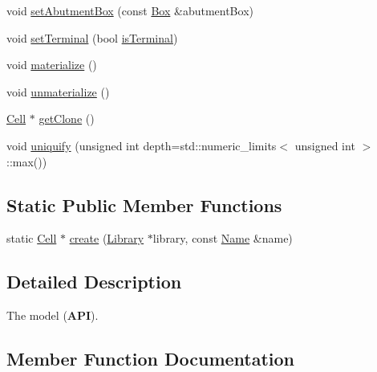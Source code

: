 \begin{DoxyCompactItemize}
void \mbox{\hyperlink{classHurricane_1_1Cell_ab1949e2b708f0bd2d215ab90cfe864e0}{set\+Abutment\+Box}} (const \mbox{\hyperlink{classHurricane_1_1Box}{Box}} \&abutment\+Box)
\item 
void \mbox{\hyperlink{classHurricane_1_1Cell_a4591dc37153a835daa42b442221742cb}{set\+Terminal}} (bool \mbox{\hyperlink{classHurricane_1_1Cell_aac4e9218b7806f3a0f2d5a55f00abd69}{is\+Terminal}})
\item 
void \mbox{\hyperlink{classHurricane_1_1Cell_affefc597317063857f4904d4b16d5d4f}{materialize}} ()
\item 
void \mbox{\hyperlink{classHurricane_1_1Cell_a40c9ba4e3fc76b0c4bc58af8dcaddf53}{unmaterialize}} ()
\item 
\mbox{\hyperlink{classHurricane_1_1Cell}{Cell}} $\ast$ \mbox{\hyperlink{classHurricane_1_1Cell_a092f53c7f517ecc70d9ba375296c5d5b}{get\+Clone}} ()
\item 
void \mbox{\hyperlink{classHurricane_1_1Cell_aa113c121813342b6304f3e7fddbc8565}{uniquify}} (unsigned int depth=std\+::numeric\+\_\+limits$<$ unsigned int $>$\+::max())
\end{DoxyCompactItemize}
\subsection*{Static Public Member Functions}
\begin{DoxyCompactItemize}
\item 
static \mbox{\hyperlink{classHurricane_1_1Cell}{Cell}} $\ast$ \mbox{\hyperlink{classHurricane_1_1Cell_ad803afb3e52bea3bf3d520e353b162e0}{create}} (\mbox{\hyperlink{classHurricane_1_1Library}{Library}} $\ast$library, const \mbox{\hyperlink{classHurricane_1_1Name}{Name}} \&name)
\end{DoxyCompactItemize}


\subsection{Detailed Description}
The model ({\bfseries A\+PI}). 

\subsection{Member Function Documentation}
\mbox{\label{classHurricane_1_1Cell_ad803afb3e52bea3bf3d520e353b162e0}} 
